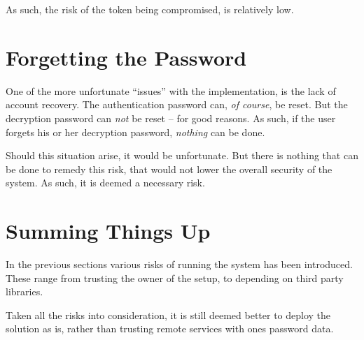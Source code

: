 		As such, the risk of the token being compromised, is relatively low.





	\section{Forgetting the Password}
		One of the more unfortunate ``issues'' with the implementation, is the lack of account recovery. The authentication password can, \emph{of course}, be reset. But the decryption password can \emph{not} be reset -- for good reasons. As such, if the user forgets his or her decryption password, \emph{nothing} can be done.

		Should this situation arise, it would be unfortunate. But there is nothing that can be done to remedy this risk, that would not lower the overall security of the system. As such, it is deemed a necessary risk.

	\section{Summing Things Up}
		In the previous sections various risks of running the system has been introduced. These range from trusting the owner of the setup, to depending on third party libraries.

		


		Taken all the risks into consideration, it is still deemed better to deploy the solution as is, rather than trusting remote services with ones password data.
